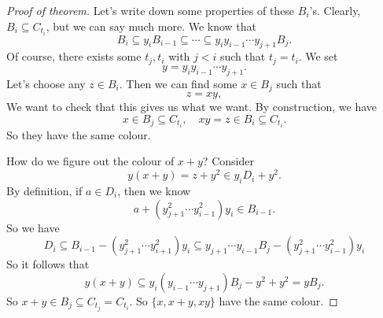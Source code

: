 \documentclass[a4paper]{article}
\begin{document}
\begin{proof}[Proof of theorem]
  Let's write down some properties of these $B_i$'s. Clearly, $B_i \subseteq C_{t_i}$, but we can say much more. We know that
  \[
    B_i \subseteq y_i B_{i - 1} \subseteq \cdots \subseteq y_{i} y_{i - 1}\cdots y_{j + 1} B_j.
  \]
  Of course, there exists some $t_j, t_i$ with $j < i$ such that $t_j = t_i$. We set
  \[
    y = y_i y_{i - 1} \cdots y_{j + 1}.
  \]
  Let's choose any $z \in B_i$. Then we can find some $x \in B_j$ such that
  \[
    z = xy,
  \]
  We want to check that this gives us what we want. By construction, we have
  \[
    x \in B_j \subseteq C_{t_i},\quad xy = z \in B_i \subseteq C_{t_i}.
  \]
  So they have the same colour.

  How do we figure out the colour of $x + y$? Consider
  \[
    y(x + y) = z + y^2 \in y_i D_i + y^2.
  \]
  By definition, if $a \in D_i$, then we know
  \[
    a + (y_{j + 1}^2 \cdots y_{i - 1}^2)y_i \in B_{i - 1}.
  \]
  So we have
  \[
    D_i \subseteq B_{i - 1} - (y_{j + 1}^2 \cdots y_{i + 1}^2)y_i \subseteq y_{j + 1} \cdots y_{i - 1} B_j - (y_{j + 1}^2 \cdots y_{i - 1}^2)y_i
  \]
  So it follows that
  \[
    y(x + y) \subseteq y_i(y_{i - 1} \cdots y_{j + 1}) B_j - y^2 + y^2 = yB_j.
  \]
  So $x + y \in B_j \subseteq C_{t_j} = C_{t_i}$. So $\{x, x + y, xy\}$ have the same colour.
\end{proof}

\printindex
\end{document}
